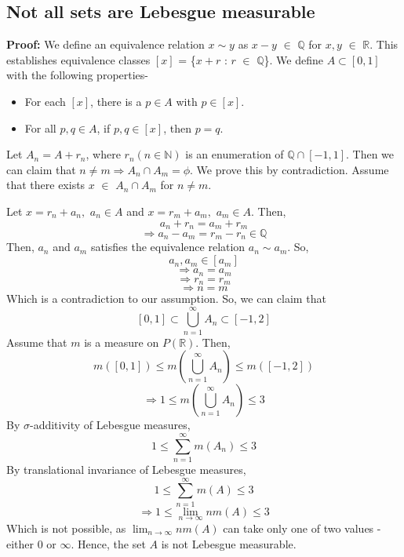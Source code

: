 \documentclass{article}
\begin{document}
\subsection{Not all sets are Lebesgue measurable}


\textbf{Proof: }We define an equivalence relation $x \sim y$ as $x - y$ $\in$ $\mathbb{Q}$ for $x, y$  $\in$ $\mathbb{R}$. This establishes equivalence classes $[x]$ = \{$x + r$ : $r$ $\in$ $\mathbb{Q}$\}. We define $A \subset [0, 1]$ with the following properties-

\begin{itemize}
	\item For each $[x]$, there is a $p \in A$ with $p \in [x]$.
	\item For all $p, q \in A$, if $p, q \in [x]$, then $p = q$.
\end{itemize}

Let $A_n = A + r_n$, where $r_n (n \in \mathbb{N})$ is an enumeration of $\mathbb{Q} \cap [-1,1]$. Then we can claim that $n \neq m \Rightarrow A_n \cap A_m = \phi$. We prove this by contradiction. Assume that there exists $x$ $\in$ $A_n \cap A_m$ for $n \neq m$.

Let $x = r_n + a_n,$ $a_n \in A$ and $x= r_m + a_m,$ $a_m \in A$. Then,
$$a_n + r_n = a_m + r_m$$
$$\Rightarrow a_n - a_m = r_m - r_n \in \mathbb{Q}$$
Then, $a_n$ and $a_m$ satisfies the equivalence relation $a_n \sim a_m$. So,
$$a_n, a_m \in [a_m]$$
$$\Rightarrow a_n = a_m$$
$$\Rightarrow r_n = r_m$$
$$\Rightarrow n = m$$
Which is a contradiction to our assumption. So, we can claim that 
$$[0, 1] \subset \bigcup\limits_{n=1}^\infty A_n \subset [-1, 2]$$
Assume that $m$ is a measure on $P(\mathbb{R})$. Then,
$$m([0, 1]) \leq m(\bigcup\limits_{n=1}^\infty A_n) \leq m([-1, 2])$$
$$\Rightarrow 1 \leq m(\bigcup\limits_{n=1}^\infty A_n) \leq 3 $$
By $\sigma$-additivity of Lebesgue measures,
$$1 \leq \sum\limits_{n=1}^\infty m(A_n) \leq 3$$
By translational invariance of Lebesgue measures,
$$1 \leq \sum\limits_{n=1}^\infty m(A) \leq 3 $$
$$\Rightarrow 1 \leq \lim_{n \rightarrow \infty} n m(A) \leq 3 $$
Which is not possible, as $\lim_{n \rightarrow \infty} n m(A)$ can take only one of two values - either 0 or $\infty$. Hence, the set $A$ is not Lebesgue measurable.
\end{document}
